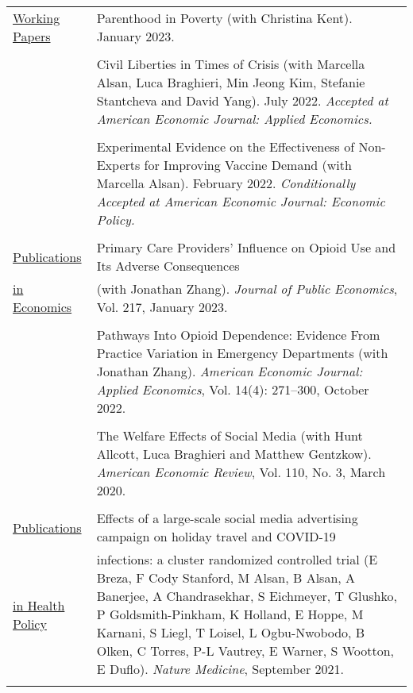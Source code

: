 \documentclass[letterpaper,11pt]{article}
\begin{document}
\begin{footnotesize}
{  \begin{tabularx}{\linewidth}{@{}
    >{\raggedright\arraybackslash\hsize=0.266\hsize}X 
    >{\raggedright\arraybackslash\hsize=1.733\hsize}X
  }
          \underline{Working Papers}  & Parenthood in Poverty (with Christina Kent). January 2023. \\
        & \\
        & Civil Liberties in Times of Crisis (with Marcella Alsan, Luca Braghieri, Min Jeong Kim, Stefanie Stantcheva and David Yang). July 2022. \textit{Accepted at American Economic Journal: Applied Economics.} \\
& \\
& Experimental Evidence on the Effectiveness of Non-Experts for Improving Vaccine Demand (with Marcella Alsan). February 2022. \textit{Conditionally Accepted at American Economic Journal: Economic Policy.} \\
        & \\
        \underline{Publications}   & Primary Care Providers’ Influence on Opioid Use and Its Adverse Consequences  \\
        \underline{in Economics}  & (with Jonathan Zhang). \textit{Journal of Public Economics}, Vol. 217, January 2023.   \\
        &  \\
& Pathways Into Opioid Dependence: Evidence From Practice Variation in Emergency Departments (with Jonathan Zhang). \textit{American Economic Journal: Applied Economics}, Vol. 14(4): 271–300, October 2022. \\  
        &  \\      
        & The Welfare Effects of Social Media (with Hunt Allcott, Luca Braghieri and Matthew Gentzkow). \textit{American Economic Review}, Vol. 110, No. 3, March 2020.  \\
        &  \\
 \underline{Publications}         & Effects of a large-scale social media advertising campaign on holiday travel and COVID-19 \\
 \underline{in Health Policy} &  infections: a cluster randomized controlled trial (E Breza, F Cody Stanford, M Alsan, B Alsan, A Banerjee, A Chandrasekhar, S Eichmeyer, T Glushko, P Goldsmith-Pinkham, K Holland, E Hoppe, M Karnani, S Liegl, T Loisel, L Ogbu-Nwobodo, B Olken, C Torres, P-L Vautrey, E Warner, S Wootton, E Duflo).  \textit{Nature Medicine}, September 2021.  \\
        &  \\

\end{tabularx}}
\end{footnotesize}
\end{document}

